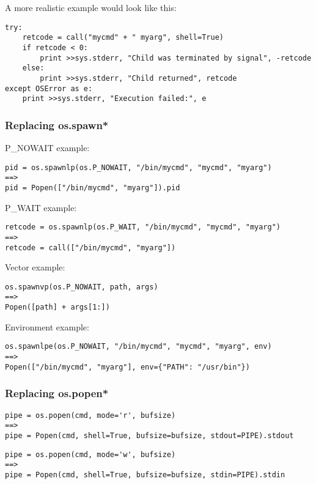 A more realistic example would look like this:

\begin{verbatim}
try:
    retcode = call("mycmd" + " myarg", shell=True)
    if retcode < 0:
        print >>sys.stderr, "Child was terminated by signal", -retcode
    else:
        print >>sys.stderr, "Child returned", retcode
except OSError as e:
    print >>sys.stderr, "Execution failed:", e
\end{verbatim}

\subsubsection{Replacing os.spawn*}

P_NOWAIT example:

\begin{verbatim}
pid = os.spawnlp(os.P_NOWAIT, "/bin/mycmd", "mycmd", "myarg")
==>
pid = Popen(["/bin/mycmd", "myarg"]).pid
\end{verbatim}

P_WAIT example:

\begin{verbatim}
retcode = os.spawnlp(os.P_WAIT, "/bin/mycmd", "mycmd", "myarg")
==>
retcode = call(["/bin/mycmd", "myarg"])
\end{verbatim}

Vector example:

\begin{verbatim}
os.spawnvp(os.P_NOWAIT, path, args)
==>
Popen([path] + args[1:])
\end{verbatim}

Environment example:

\begin{verbatim}
os.spawnlpe(os.P_NOWAIT, "/bin/mycmd", "mycmd", "myarg", env)
==>
Popen(["/bin/mycmd", "myarg"], env={"PATH": "/usr/bin"})
\end{verbatim}

\subsubsection{Replacing os.popen*}

\begin{verbatim}
pipe = os.popen(cmd, mode='r', bufsize)
==>
pipe = Popen(cmd, shell=True, bufsize=bufsize, stdout=PIPE).stdout
\end{verbatim}

\begin{verbatim}
pipe = os.popen(cmd, mode='w', bufsize)
==>
pipe = Popen(cmd, shell=True, bufsize=bufsize, stdin=PIPE).stdin
\end{verbatim}

